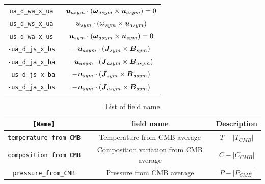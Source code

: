 \begin{table}[htp]
\begin{center}
\begin{tabular}{|c|c|}
\tt  ua\_d\_wa\_x\_ua  &  $  \mbox{\boldmath$u$}_{asym} \cdot  \left( \mbox{\boldmath$\omega$}_{asym} \times \mbox{\boldmath$u$}_{asym} \right) = 0$ \\
\tt  us\_d\_ws\_x\_ua  &  $  \mbox{\boldmath$u$}_{sym} \cdot  \left( \mbox{\boldmath$\omega$}_{sym} \times \mbox{\boldmath$u$}_{asym} \right)$ \\
\tt  us\_d\_wa\_x\_us &  $   \mbox{\boldmath$u$}_{sym} \cdot  \left( \mbox{\boldmath$\omega$}_{asym} \times \mbox{\boldmath$u$}_{sym} \right) = 0$ \\ \hline
%
\tt -ua\_d\_js\_x\_bs  &  $ -\mbox{\boldmath$u$}_{asym} \cdot \left(\mbox{\boldmath$J$}_{sym} \times \mbox{\boldmath$B$}_{sym} \right) $ \\
\tt -ua\_d\_ja\_x\_ba  &  $ -\mbox{\boldmath$u$}_{asym}  \cdot  \left(\mbox{\boldmath$J$}_{asym} \times \mbox{\boldmath$B$}_{asym} \right) $ \\
\tt -us\_d\_js\_x\_ba  &  $ -\mbox{\boldmath$u$}_{sym}  \cdot  \left(\mbox{\boldmath$J$}_{sym} \times \mbox{\boldmath$B$}_{asym} \right) $ \\
\tt -us\_d\_ja\_x\_bs  &  $ -\mbox{\boldmath$u$}_{sym}  \cdot  \left(\mbox{\boldmath$J$}_{asym} \times \mbox{\boldmath$B$}_{sym} \right) $ \\ \hline
%
\end{tabular}
\end{center}
\label{table:energy_flux_sym}
\end{table}
%
%
\begin{table}[htp]
\caption{List of field name}
\begin{center}
\begin{tabular}{|c|c|c|}
\hline
\tt [Name] & field name & Description \\ \hline \hline
\tt temperature\_from\_CMB & Temperature from CMB average & $T - |T_{CMB}|$ \\
\tt composition\_from\_CMB & Composition variation from CMB average & $C - |C_{CMB}|$ \\
\tt pressure\_from\_CMB & Pressure from CMB average & $P - |P_{CMB}|$ \\
\hline
%
\end{tabular}
\end{center}
\label{table:field_components}
\end{table}


